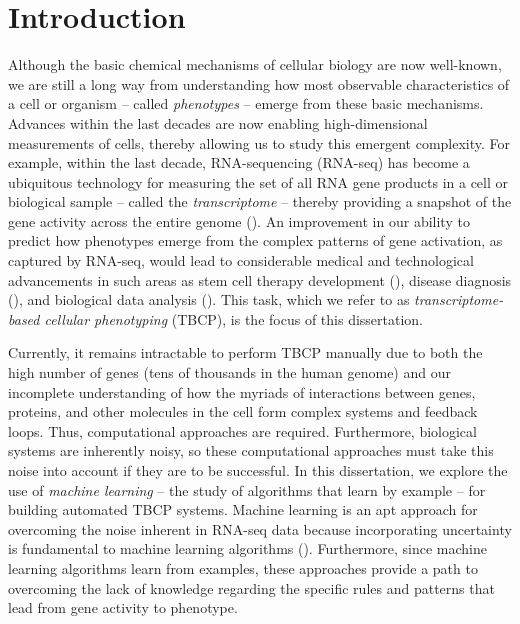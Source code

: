 \chapter{Introduction} \label{chap:intro}

Although the basic chemical mechanisms of cellular biology are now well-known, we are still a long way from understanding how most observable characteristics of a cell or organism -- called \textit{phenotypes} -- emerge from these basic mechanisms. Advances within the last decades are now enabling high-dimensional measurements of cells, thereby allowing us to study this emergent complexity.  For example, within the last decade, RNA-sequencing (RNA-seq) has become a ubiquitous technology for measuring the set of all RNA gene products in a cell or biological sample -- called the \textit{transcriptome} -- thereby providing a snapshot of the gene activity across the entire genome (\citealp{Wang2009}).  An improvement in our ability to predict how phenotypes emerge from the complex patterns of gene activation, as captured by RNA-seq, would lead to considerable medical and technological advancements in such areas as stem cell therapy development (\citealp{Cahan, Morris2014}), disease diagnosis (\citealp{Kegerreis2019, Bryon2016, Saddiki2015, Marisa2013, Chuang2007}), and biological data analysis (\citealp{Hou2019, Alavi2018, Ellis}).  This task, which we refer to as \textit{transcriptome-based cellular phenotyping} (TBCP), is the focus of this dissertation.

Currently, it remains intractable to perform TBCP manually due to both the high number of genes (tens of thousands in the human genome) and our incomplete understanding of how the myriads of interactions between genes, proteins, and other molecules in the cell form complex systems and feedback loops.  Thus, computational approaches are required. Furthermore, biological systems are inherently noisy, so these computational approaches must take this noise into account if they are to be successful. In this dissertation, we explore the use of \textit{machine learning} --  the study of algorithms that learn by example -- for building automated TBCP systems.  Machine learning is an apt approach for overcoming the noise inherent in RNA-seq data because incorporating uncertainty is fundamental to machine learning algorithms (\citealp{Ghahramani2015}).  Furthermore, since machine learning algorithms learn from examples, these approaches provide a path to overcoming the lack of knowledge regarding the specific rules and patterns that lead from gene activity to phenotype. 
 
